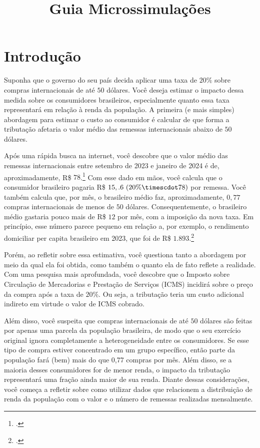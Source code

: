 \documentclass[12pt]{article}
\title{Guia Microssimulações}
\author{ }
\date{ }
\theoremstyle{break}
\begin{document}
\maketitle
\tableofcontents

\section{Introdução}
\label{sec:introducao}

Suponha que o governo do seu país decida aplicar uma taxa de $20\%$  sobre compras internacionais de até $50$ dólares. Você deseja estimar o impacto dessa medida sobre os consumidores brasileiros, especialmente quanto essa taxa representará em relação à renda da população. A primeira (e mais simples) abordagem para estimar o custo ao consumidor é calcular de que forma a tributação afetaria o valor médio das remessas internacionais abaixo de $50$ dólares. 

Após uma rápida busca na internet, você descobre que o valor médio das remessas internacionais entre setembro de 2023 e janeiro de 2024 é de, aproximadamente, R\$ $78$.\footnote{\textcite{folha_remessas}.} Com esse dado em mãos, você calcula que o consumidor brasileiro pagaria R\$ $15,.6 \ (20\% \timescdot 78)$ por remessa. Você também calcula que, por mês, o brasileiro médio faz, aproximadamente, $0,77$ compras internacionais de menos de $50$ dólares. Consequentemente, o brasileiro médio gastaria pouco mais de R\$ $12$ por mês, com a imposição da nova taxa. Em princípio, esse número parece pequeno em relação a, por exemplo, o rendimento domiciliar per capita brasileiro em 2023, que foi de R\$ $1.893$.\footnote{\textcite{poder360rendadomiciliar}.}

Porém, ao refletir sobre essa estimativa, você questiona tanto a abordagem por meio da qual ela foi obtida, como também o quanto ela de fato reflete a realidade. Com uma pesquisa mais aprofundada, você descobre que o Imposto sobre Circulação de Mercadorias e Prestação de Serviços (ICMS) incidirá sobre o preço da compra após a taxa de $20\%$. Ou seja, a tributação teria um custo adicional indireto em virtude o valor de ICMS cobrado. 

Além disso, você suspeita que compras internacionais de até $50$ dólares são feitas por apenas uma parcela da população brasileira, de modo que o seu exercício original ignora completamente a heterogeneidade entre os consumidores. Se esse tipo de compra estiver concentrado em um grupo específico, então parte da população fará (bem) mais do que 0,77 compras por mês. Além disso, se a maioria desses consumidores for de menor renda, o impacto da tributação representará uma fração ainda maior de sua renda. Diante dessas considerações, você começa a refletir sobre como utilizar dados que relacionem a distribuição de renda da população com o valor e o número de remessas realizadas mensalmente. 
\end{document}
